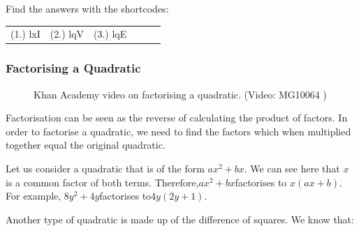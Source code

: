   \label{m39383**end}
\par {} Find the answers with the shortcodes:
 \par \begin{tabular}[h]{cccccc}
 (1.) lxI  &  (2.) lqV  &  (3.) lqE  & \end{tabular}
    \label{m39394*cid5}
            \subsubsection{ Factorising a Quadratic}
            \nopagebreak
      \label{m39394*eip-218}
    \setcounter{subfigure}{0}
	\begin{figure}[H] %
    \textnormal{Khan Academy video on factorising a quadratic.}\vspace{.1in} \nopagebreak
  \label{m39394*yt-media2}\label{m39394*yt-video2}
             { (Video:  MG10064 )}
      \vspace{2pt}
    \vspace{.1in}
 \end{figure}       \par \label{m39394*eip-411}Factorisation can be seen as the reverse of calculating the product of factors. In order to factorise a quadratic, we need to find the factors which when multiplied together equal the original quadratic.\par 
      \label{m39394*id275057}Let us consider a quadratic that is of the form $a{x}^{2}+bx$\hspace{1ex}. We can see here that $x$ is a common factor of both terms. Therefore,\hspace{1ex}$a{x}^{2}+bx$\hspace{1ex}factorises to $x\left(ax+b\right)$. For example, $8{y}^{2}+4y$\hspace{1ex}factorises to\hspace{1ex}$4y\left(2y+1\right)$.\par 
      \label{m39394*id275188}Another type of quadratic is made up of the difference of squares. We know that:\par 
      \label{m39394*id275192}\nopagebreak\noindent{}
